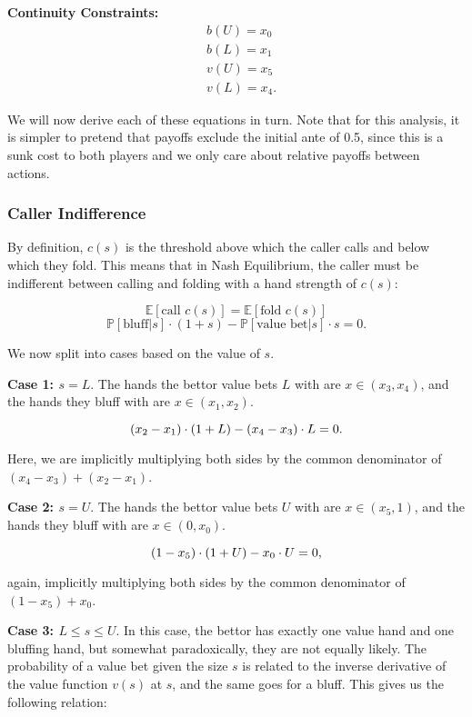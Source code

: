 \documentclass[../../main/main.tex]{subfiles}
\begin{document}
\textbf{Continuity Constraints:}
\begin{align}
    & b(U) = x_0 \\
    & b(L) = x_1 \\
    & v(U) = x_5 \\
    & v(L) = x_4.
\end{align}

We will now derive each of these equations in turn. Note that for this analysis, it is simpler to pretend that payoffs exclude the initial ante of 0.5, since this is a sunk cost to both players and we only care about relative payoffs between actions.

\subsubsection{Caller Indifference}
\label{subsec:caller_indifference}

By definition, $c(s)$ is the threshold above which the caller calls and below which they fold. This means that in Nash Equilibrium, the caller must be indifferent between calling and folding with a hand strength of $c(s)$:


  \[  \mathbb{E}[\text{call } c(s)] = \mathbb{E}[\text{fold } c(s)] \]
  \[  \mathbb{P}[\text{bluff} | s] \cdot (1+s) - \mathbb{P}[\text{value bet} | s]\cdot s = 0. \]

We now split into cases based on the value of $s$.

\textbf{Case 1: $s = L$}. The hands the bettor value bets $L$ with are $x \in (x_3, x_4)$, and the hands they bluff with are $x \in (x_1, x_2)$. 

\begin{equation}{\label{callindiffmin}}
    (x_2-x_1) \cdot (1+L) - (x_4-x_3) \cdot L = 0.
\end{equation}

Here, we are implicitly multiplying both sides by the common denominator of $(x_4-x_3) + (x_2-x_1)$.

\textbf{Case 2: $s = U$}. The hands the bettor value bets $U$ with are $x \in (x_5, 1)$, and the hands they bluff with are $x \in (0, x_0)$. 

\begin{equation}{\label{callindiffmax}}
    (1-x_5) \cdot (1+U) - x_0 \cdot U = 0,
\end{equation}

again, implicitly multiplying both sides by the common denominator of $(1-x_5) + x_0$.

\textbf{Case 3: $L \leq s \leq U$}. In this case, the bettor has exactly one value hand and one bluffing hand, but somewhat paradoxically, they are not equally likely. The probability of a value bet given the size $s$ is related to the inverse derivative of the value function $v(s)$ at $s$, and the same goes for a bluff. This gives us the following relation:
\end{document}
